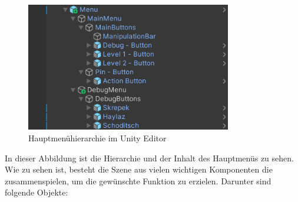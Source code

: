 \begin{figure}[h]
\centering
\includegraphics[width=0.8\textwidth]{images/menuHierarchy.png}
\caption{Hauptmenühierarchie im Unity Editor}
\label{fig:menühierarchy}
\end{figure}


In dieser Abbildung ist die Hierarchie und der Inhalt des Hauptmenüs zu sehen. Wie zu sehen ist, besteht die Szene aus
vielen wichtigen Komponenten die zusammenspielen, um die gewünschte Funktion zu erzielen. Darunter sind folgende Objekte:

